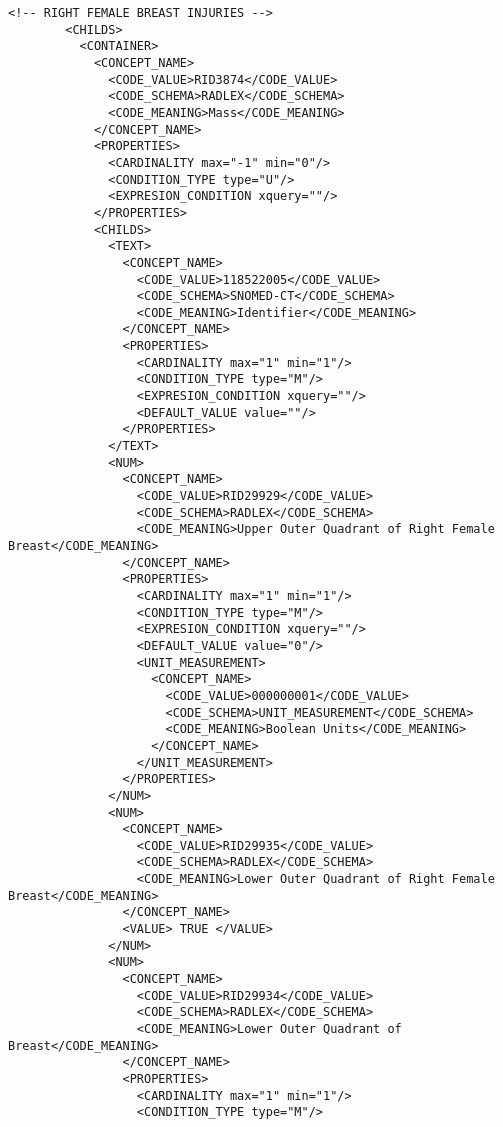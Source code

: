 \begin{lstlisting}[label=dicom-template,caption=Plantilla de un informe estructurado de una exploración de mama]
        <!-- RIGHT FEMALE BREAST INJURIES -->
        <CHILDS>
          <CONTAINER>
            <CONCEPT_NAME>
              <CODE_VALUE>RID3874</CODE_VALUE>
              <CODE_SCHEMA>RADLEX</CODE_SCHEMA>
              <CODE_MEANING>Mass</CODE_MEANING>
            </CONCEPT_NAME>
            <PROPERTIES>
              <CARDINALITY max="-1" min="0"/>
              <CONDITION_TYPE type="U"/>
              <EXPRESION_CONDITION xquery=""/>
            </PROPERTIES>
            <CHILDS>
              <TEXT>
                <CONCEPT_NAME>
                  <CODE_VALUE>118522005</CODE_VALUE>
                  <CODE_SCHEMA>SNOMED-CT</CODE_SCHEMA>
                  <CODE_MEANING>Identifier</CODE_MEANING>
                </CONCEPT_NAME>
                <PROPERTIES>
                  <CARDINALITY max="1" min="1"/>
                  <CONDITION_TYPE type="M"/>
                  <EXPRESION_CONDITION xquery=""/>
                  <DEFAULT_VALUE value=""/>
                </PROPERTIES>
              </TEXT>
              <NUM>
                <CONCEPT_NAME>
                  <CODE_VALUE>RID29929</CODE_VALUE>
                  <CODE_SCHEMA>RADLEX</CODE_SCHEMA>
                  <CODE_MEANING>Upper Outer Quadrant of Right Female Breast</CODE_MEANING>
                </CONCEPT_NAME>
                <PROPERTIES>
                  <CARDINALITY max="1" min="1"/>
                  <CONDITION_TYPE type="M"/>
                  <EXPRESION_CONDITION xquery=""/>
                  <DEFAULT_VALUE value="0"/>
                  <UNIT_MEASUREMENT>
                    <CONCEPT_NAME>
                      <CODE_VALUE>000000001</CODE_VALUE>
                      <CODE_SCHEMA>UNIT_MEASUREMENT</CODE_SCHEMA>
                      <CODE_MEANING>Boolean Units</CODE_MEANING>
                    </CONCEPT_NAME>
                  </UNIT_MEASUREMENT>
                </PROPERTIES>
              </NUM>
              <NUM>
                <CONCEPT_NAME>
                  <CODE_VALUE>RID29935</CODE_VALUE>
                  <CODE_SCHEMA>RADLEX</CODE_SCHEMA>
                  <CODE_MEANING>Lower Outer Quadrant of Right Female Breast</CODE_MEANING>
                </CONCEPT_NAME>
                <VALUE> TRUE </VALUE>
              </NUM>
              <NUM>
                <CONCEPT_NAME>
                  <CODE_VALUE>RID29934</CODE_VALUE>
                  <CODE_SCHEMA>RADLEX</CODE_SCHEMA>
                  <CODE_MEANING>Lower Outer Quadrant of Breast</CODE_MEANING>
                </CONCEPT_NAME>
                <PROPERTIES>
                  <CARDINALITY max="1" min="1"/>
                  <CONDITION_TYPE type="M"/>

\end{lstlisting}

